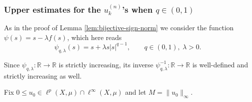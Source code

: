 \documentclass[journal]{article}
\theoremstyle{nonitalic}
\theoremstyle{nonitalic}
\theoremstyle{plain} %
\numberwithin{equation}{section}
\newcommand{\R}{\mathbb{R}}
\begin{document}
\subsubsection{Upper estimates for the $u_k^{(n)}$'s when $q\in(0,1)$}\label{estimates}
As in the proof of Lemma \ref{lem:bijective-sign-norm} we consider the function $\psi(s)=s-\lambda f(s)$, which here reads 
\begin{equation}\label{eq:vartheta}
    \psi_{q,\lambda} (s) = s + \lambda s|s|^{q-1}, \qquad  q\in (0,1), \; \lambda >0.
\end{equation}

Since $\psi_{q,\lambda}: \R \to\R$ is strictly increasing, its inverse $\psi_{q,\lambda}^{-1}: \R \to\R$ is well-defined and strictly increasing as well.


Fix  $0 \leq u_0 \in \ell^p(X,\mu) \cap \ell^\infty(X,\mu)$ and let $M = \|u_0\|_\infty$.  
\\
\end{document}
